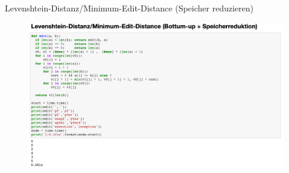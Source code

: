 \documentclass[aspectratio=169]{beamer}
\begin{document}
\begin{frame}[fragile]{Levenshtein-Distanz/Minimum-Edit-Distance (Speicher reduzieren)}
\begin{figure}
    \centering
    \includegraphics[width=0.9\linewidth]{code_bottom_up_space.png}
\end{figure}
\end{frame}





\end{document}
